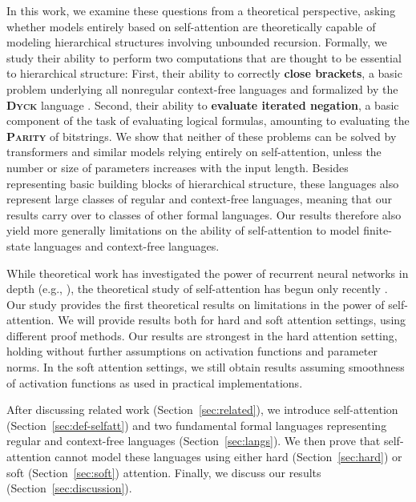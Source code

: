 \documentclass[11pt,a4paper]{article}
\newcommand{\key}[1]{\textbf{#1}}
\begin{document}
In this work, we examine these questions from a theoretical perspective, asking whether models entirely based on self-attention are theoretically capable of modeling hierarchical structures involving unbounded recursion.
Formally, we study their ability to perform two computations that are thought to be essential to hierarchical structure:
First, their ability to correctly \key{close brackets}, a basic problem underlying all nonregular context-free languages and formalized by the \key{\textsc{Dyck}} language \cite{chomsky1963algebraic}.
Second, their ability to \key{evaluate iterated negation}, a basic component of the task of evaluating logical formulas, amounting to evaluating the \key{\textsc{Parity}} of bitstrings.
We show that neither of these problems can be solved by transformers and similar models relying entirely on self-attention, unless the number or size of parameters increases with the input length.
Besides representing basic building blocks of hierarchical structure, these languages also represent large classes of regular and context-free languages, meaning that our results carry over to classes of other formal languages.
Our results therefore also yield more generally limitations on the ability of self-attention to model finite-state languages and context-free languages.

While theoretical work has investigated the power of recurrent neural networks in depth (e.g., \citet{siegelman1991neural, bengio1994learning, weiss2018practical, miller2018recurrent, merrill2019sequential}), the theoretical study of self-attention has begun only recently \citep{perez2019turing,hsieh2019robustness}.
Our study provides the first theoretical results on limitations in the power of self-attention.
We will provide results both for hard and soft attention settings, using different proof methods.
Our results are strongest in the hard attention setting, holding without further assumptions on activation functions and parameter norms.
In the soft attention settings, we still obtain results assuming smoothness of activation functions as used in practical implementations.

After discussing related work (Section~\ref{sec:related}), we introduce self-attention (Section~\ref{sec:def-selfatt}) and two fundamental formal languages representing regular and context-free languages (Section~\ref{sec:langs}).
We then prove that self-attention cannot model these languages using either hard (Section~\ref{sec:hard}) or soft (Section~\ref{sec:soft}) attention.
Finally, we discuss our results (Section~\ref{sec:discussion}).
\end{document}
